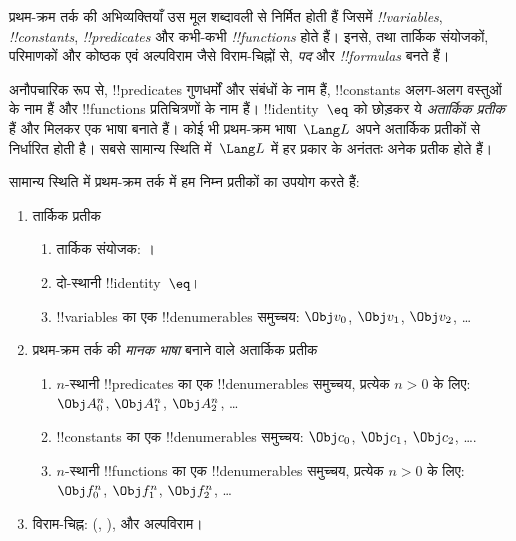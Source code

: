 \documentclass[../../../include/open-logic-section]{subfiles}
\begin{document}



प्रथम-क्रम तर्क की अभिव्यक्तियाँ उस मूल शब्दावली से निर्मित होती हैं जिसमें
\emph{!!{variable}s}, \emph{!!{constant}s}, \emph{!!{predicate}s} और कभी-कभी
\emph{!!{function}s} होते हैं। इनसे, तथा तार्किक संयोजकों, परिमाणकों और
कोष्ठक एवं अल्पविराम जैसे विराम-चिह्नों से, \emph{पद} और
\emph{!!{formula}s} बनते हैं।

\begin{explain}
अनौपचारिक रूप से, !!{predicate}s गुणधर्मों और संबंधों के नाम हैं,
!!{constant}s अलग-अलग वस्तुओं के नाम हैं और !!{function}s प्रतिचित्रणों के
नाम हैं। !!{identity}~$\eq$ को छोड़कर ये \emph{अतार्किक प्रतीक} हैं और
मिलकर एक भाषा बनाते हैं। कोई भी प्रथम-क्रम भाषा~$\Lang L$ अपने अतार्किक
प्रतीकों से निर्धारित होती है। सबसे सामान्य स्थिति में~$\Lang L$ में हर
प्रकार के अनंततः अनेक प्रतीक होते हैं।
\end{explain}

सामान्य स्थिति में प्रथम-क्रम तर्क में हम निम्न प्रतीकों का उपयोग करते हैं:

\begin{enumerate}
\item तार्किक प्रतीक
\begin{enumerate}
\item तार्किक संयोजक:
  \startycommalist
  ।
\item दो-स्थानी !!{identity}~$\eq$।
\item !!{variable}s का एक !!{denumerable}s समुच्चय: $\Obj v_0$, $\Obj v_1$, $\Obj
  v_2$, \dots
\end{enumerate}
\item प्रथम-क्रम तर्क की \emph{मानक भाषा} बनाने वाले अतार्किक प्रतीक
\begin{enumerate}
\item $n$-स्थानी !!{predicate}s का एक !!{denumerable}s समुच्चय, प्रत्येक $n>0$ के लिए: $\Obj
  A^n_0$, $\Obj A^n_1$, $\Obj A^n_2$, \dots
\item !!{constant}s का एक !!{denumerable}s समुच्चय: $\Obj c_0$, $\Obj c_1$, $\Obj
  c_2$, \dots.
\item $n$-स्थानी !!{function}s का एक !!{denumerable}s समुच्चय, प्रत्येक $n>0$ के लिए:
  $\Obj f^n_0$, $\Obj f^n_1$, $\Obj f^n_2$, \dots
\end{enumerate}
\item विराम-चिह्न: (, ), और अल्पविराम।
\end{enumerate}
\end{document}
